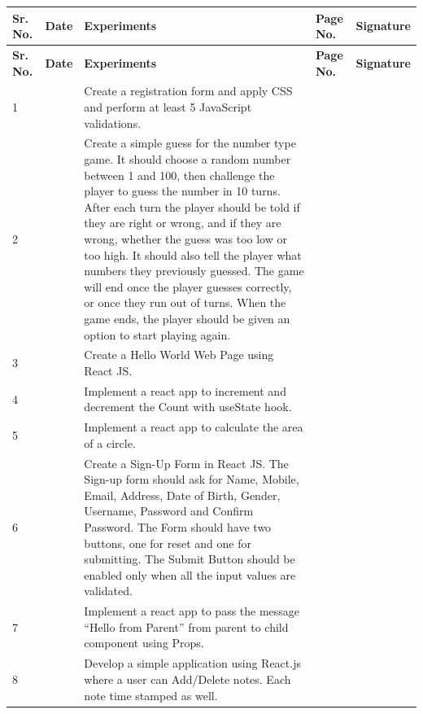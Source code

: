 \documentclass[a4paper,12pt]{article}
\begin{document}
\begin{longtable}{|>{\centering\arraybackslash}p{1cm}|>{\centering\arraybackslash}p{2cm}|p{8.5cm}|>{\centering\arraybackslash}p{1.2cm}|>{\centering\arraybackslash}p{2cm}|}
\hline
\textbf{Sr. No.} & \textbf{Date} & \centering\textbf{Experiments} & \textbf{Page No.} & \textbf{Signature} \\
\hline
\endfirsthead
\hline
\textbf{Sr. No.} & \textbf{Date} & \centering\textbf{Experiments} & \textbf{Page No.} & \textbf{Signature} \\
\hline
\endhead

1 & & Create a registration form and apply CSS and perform at least 5 JavaScript validations. & & \\[40pt]
\hline

2 & & Create a simple guess for the number type game. It should choose a random number between 1 and 100, then challenge the player to guess the number in 10 turns. After each turn the player should be told if they are right or wrong, and if they are wrong, whether the guess was too low or too high. It should also tell the player what numbers they previously guessed. The game will end once the player guesses correctly, or once they run out of turns. When the game ends, the player should be given an option to start playing again. & & \\[10pt]
\hline

3 & & Create a Hello World Web Page using React JS. & & \\[40pt]
\hline

4 & & Implement a react app to increment and decrement the Count with useState hook. & & \\[30pt]
\hline

5 & & Implement a react app to calculate the area of a circle. & & \\[40pt]
\hline

6 & & Create a Sign-Up Form in React JS. The Sign-up form should ask for Name, Mobile, Email, Address, Date of Birth, Gender, Username, Password and Confirm Password. The Form should have two buttons, one for reset and one for submitting. The Submit Button should be enabled only when all the input values are validated. & & \\[10pt]
\hline

7 & & Implement a react app to pass the message ``Hello from Parent'' from parent to child component using Props. & & \\[30pt]
\hline

8 & & Develop a simple application using React.js where a user can Add/Delete notes. Each note time stamped as well. & & \\[30pt]
\hline


\end{longtable}
\end{document}

